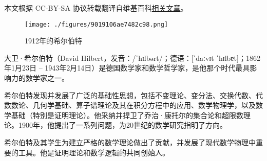 
本文根据 CC-BY-SA 协议转载翻译自维基百科\href{https://en.wikipedia.org/wiki/David_Hilbert}{相关文章}。

\begin{figure}[ht]
\centering
\texttt{[image: ./figures/9019106ae7482c98.png]}
\caption{1912年的希尔伯特} \label{fig_David_1}
\end{figure}
大卫·希尔伯特（David Hilbert，发音：/ˈhɪlbərt/；德语：[ˈdaːvɪt ˈhɪlbɐt]；1862年1月23日 – 1943年2月14日）是德国数学家和数学哲学家，是他那个时代最具影响力的数学家之一。

希尔伯特发现并发展了广泛的基础性思想，包括不变理论、变分法、交换代数、代数数论、几何学基础、算子谱理论及其在积分方程中的应用、数学物理学，以及数学基础（特别是证明理论）。他采纳并捍卫了乔治·康托尔的集合论和超限数理论。1900年，他提出了一系列问题，为20世纪的数学研究指明了方向。

希尔伯特及其学生为建立严格的数学理论做出了贡献，并发展了现代数学物理中重要的工具。他是证明理论和数学逻辑的共同创始人。